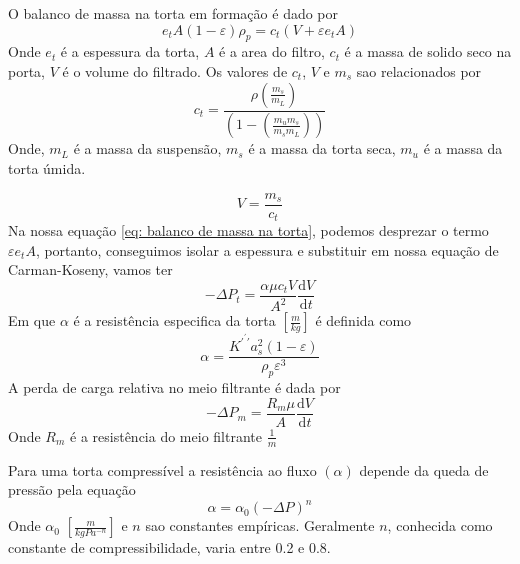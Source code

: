 O balanco de massa na torta em formação é dado por
\begin{equation}\label{eq: balanco de massa na torta}
    e_{t} A(1 - \varepsilon )\rho _{p} = c_{t} (V + \varepsilon e_{t} A)
\end{equation}
Onde \(e_{t}\) é a espessura da torta, \(A\) é a area do filtro, \(c_{t}\) é a massa de solido seco
na porta, \(V\) é o volume do filtrado. Os valores de \(c_{t} \), \(V\) e \(m_{s} \)  sao
relacionados por
\begin{equation}
    c_{t} = \frac{\rho \left( \frac{m_{s} }{m_{L} } \right) }{\left( 1 - \left( \frac{m_u m_{s} }{m_{s} m_{L} } \right)  \right) }
\end{equation}
Onde, \(m_{L} \) é a massa da suspensão, \(m_{s} \) é a massa da torta seca, \(m_{u} \) é a massa da torta úmida. \par
\begin{equation}
    V = \frac{m_{s} }{c_{t} }
\end{equation}
Na nossa equação \ref{eq: balanco de massa na torta}, podemos desprezar o termo \(\varepsilon e_{t}
A\), portanto, conseguimos isolar a espessura e substituir em nossa equação de Carman-Koseny, vamos
ter
\begin{equation}
    - \Delta P_{t} = \frac{\alpha \mu c_{t} V}{A^{2} }\frac{\mathrm{d}V}{\mathrm{d}t} 
\end{equation}
Em que \(\alpha \) é a resistência especifica da torta \([\frac{m}{kg}]\) é definida como
\begin{equation}
    \alpha = \frac{K^{\prime^{\prime}  \prime } a_{s} ^{2} (1 - \varepsilon )}{\rho _{p} \varepsilon ^{3} }
\end{equation}
A perda de carga relativa no meio filtrante é dada por
\begin{equation}
    -\Delta P_{m} = \frac{R_{m} \mu}{A}\frac{\mathrm{d}V}{\mathrm{d}t} 
\end{equation}
Onde \(R_{m}\) é a resistência do meio filtrante \(\frac{1}{m}\)\par
Para uma torta compressível a resistência ao fluxo \((\alpha )\) depende da queda de pressão pela equação
\begin{equation}
    \alpha = \alpha _{0} \left( - \Delta P \right) ^{n}
\end{equation} 
Onde \(\alpha _{0}\) \([\frac{m}{kgPa^{-n}}]\) e \(n\) sao constantes empíricas. Geralmente \(n\),
conhecida como constante de compressibilidade, varia entre 0.2 e 0.8. \par

